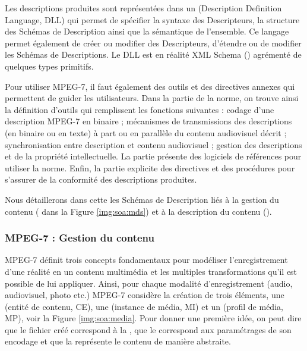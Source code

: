 Les descriptions produites sont représentées dans un  (Description Definition Language, DLL) qui permet de spécifier la syntaxe des Descripteurs, la structure des Schémas de Description ainsi que la sémantique de l'ensemble.
Ce langage permet également de créer ou modifier des Descripteurs, d'étendre ou de modifier les Schémas de Descriptions. 
Le DLL est en réalité XML Schema (\cite{Fallside2004}) agrémenté de quelques types primitifs.

Pour utiliser MPEG-7, il faut également des outils et des directives annexes qui permettent de guider les utilisateurs. 
Dans la partie  de la norme, on trouve ainsi la définition d'outils qui remplissent les fonctions suivantes : codage d'une description MPEG-7 en binaire ; mécanismes de transmissions des descriptions (en binaire ou en texte) à part ou en parallèle du contenu audiovisuel décrit ;  synchronisation entre description et contenu audiovisuel ; gestion des descriptions et de la propriété intellectuelle. 
La partie  présente des logiciels de références pour utiliser la norme.
Enfin, la partie  explicite des directives et des procédures pour s'assurer de la conformité des descriptions produites.

Nous détaillerons dans cette les Schémas de Description liés à la gestion du contenu ( dans la Figure \ref{img:soa:mds}) et à la description du contenu ().\\


\subsubsection{MPEG-7 : Gestion du contenu}\label{sec:mpeg7-gc}
MPEG-7 définit trois concepts fondamentaux pour modéliser l'enregistrement d'une réalité en un contenu multimédia et les multiples transformations qu'il est possible de lui appliquer. 
Ainsi, pour chaque modalité d'enregistrement (audio, audiovisuel, photo etc.) MPEG-7 considère la création de trois éléments, une  (entité de contenu, CE), une  (instance de média, MI) et un  (profil de média, MP), voir la Figure \ref{img:soa:media}.
Pour donner une première idée, on peut dire que le fichier créé correspond à la , que le  correspond aux paramétrages de son encodage et que la  représente le contenu de manière abstraite.


